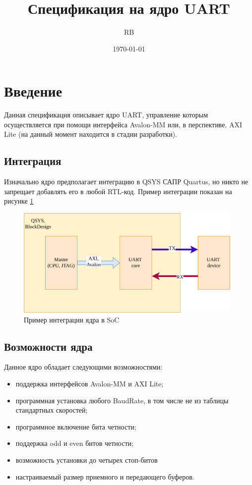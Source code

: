 \documentclass[a4paper,12pt]{article}
\title{\Huge\textbf{Спецификация на ядро UART}}
\author{\huge RB}
\date{\today}
\begin{document}
\maketitle
\newpage


%
%
\listoffigures
{}
\newpage

%
\listoftables
{}
\newpage


%
%
%
%
\section{Введение}
\label{sec:introduction}

Данная спецификация описывает ядро UART, управление которым осуществляется при помощи интерфейса Avalon-MM или, в перспективе, AXI Lite (на данный момент находится в стадии разработки).

    \subsection{Интеграция}
    Изначально ядро предполагает интеграцию в QSYS САПР Quartus, но никто не запрещает добавлять его в любой RTL-код. Пример интеграции показан на рисунке \ref{img:integrated_ip}

    \begin{figure}[H]
        \centering
        \includegraphics[width=11cm]{Integrate.png}
        \caption{Пример интеграции ядра в SoC}
        \label{img:integrated_ip}
    \end{figure}

    \subsection{Возможности ядра}
    Данное ядро обладает следующими возможностями:
    \begin{itemize}
     \item поддержка интерфейсов Avalon-MM и AXI Lite;
     \item программная установка любого BaudRate, в том числе не из таблицы стандартных скоростей;
     \item программное включение бита четности;
     \item поддержка odd и even битов четности;
     \item возможность установки до четырех стоп-битов
     \item настраиваемый размер приемного и передающего буферов.
    \end{itemize}
\end{document}
